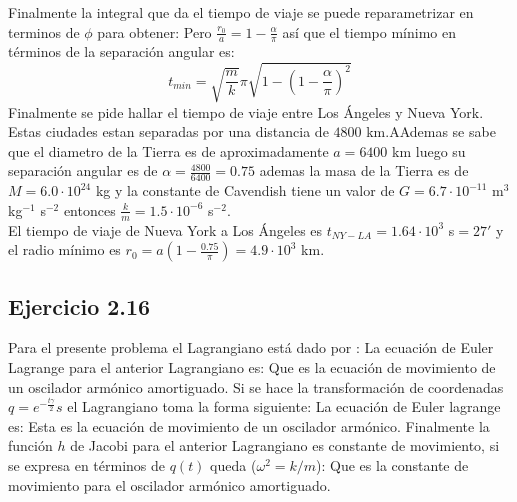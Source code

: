Finalmente la integral que da el tiempo de viaje se puede reparametrizar en terminos de $\phi$ para obtener:
Pero $\frac{r_0}{a}=1-\frac{\alpha}{\pi}$ as\'i que el tiempo m\'inimo en t\'erminos de la separaci\'on angular es:
$$
t_{min}=\sqrt{\frac{m}{k}} \pi \sqrt{1-\left(1-\frac{\alpha}{\pi}\right)^2}
$$
Finalmente se pide hallar el tiempo de viaje entre Los \'Angeles y Nueva York. Estas ciudades estan separadas por una distancia de $4800$ km.AAdemas se sabe que el diametro de la Tierra es de aproximadamente $a=6400$ km luego su separaci\'on angular es de $\alpha=\frac{4800}{6400}=0.75$ ademas la masa de la Tierra es de $M=6.0\cdot10^{24}$ kg y la constante de Cavendish tiene un valor de $G=6.7 \cdot 10^{-11}$ m$^3$ kg$^{-1}$ s$^{-2}$ entonces $\frac{k}{m}=1.5 \cdot 10^{-6}$ s$^{-2}$.\\
El tiempo de viaje de Nueva York a Los \'Angeles es $t_{NY-LA}=1.64\cdot10^3$ s$=27'$ y el radio m\'inimo es $r_0=a \left(1-\frac{0.75}{\pi}\right)=4.9\cdot 10^3$ km.









\subsection*{Ejercicio 2.16}
Para el presente problema el Lagrangiano est\'a dado por :
La ecuaci\'on de Euler Lagrange para el anterior Lagrangiano es:
Que es la ecuaci\'on de movimiento de un oscilador arm\'onico amortiguado.
Si se hace la transformaci\'on de coordenadas $q=e^{-\frac{t \gamma }{2}} s $ el Lagrangiano toma la forma siguiente:
La ecuaci\'on de Euler lagrange es:
Esta es la ecuaci\'on de movimiento de un oscilador arm\'onico.
Finalmente la funci\'on $h$ de Jacobi para el anterior Lagrangiano es constante de movimiento, si se expresa en t\'erminos de $q(t)$ queda ($\omega^2=k/m$):
Que es la constante de movimiento para el oscilador arm\'onico amortiguado.
 



